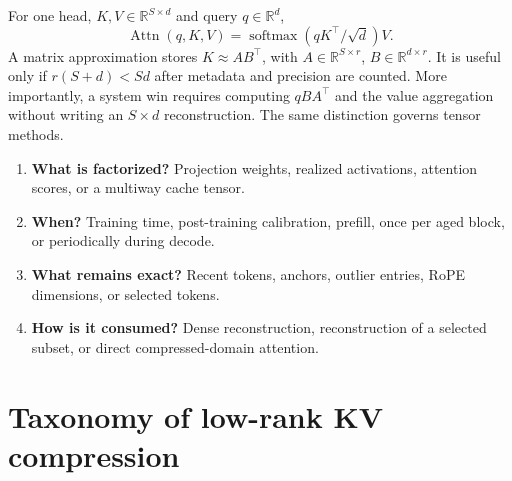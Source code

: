 \documentclass[10pt]{article}
\newcommand{\R}{\mathbb{R}}
\newcommand{\Attn}{\operatorname{Attn}}
\newcommand{\softmax}{\operatorname{softmax}}
\begin{document}
For one head, $K,V\in\R^{S\times d}$ and query $q\in\R^d$,
\[
 \Attn(q,K,V)=\softmax(qK^\top/\sqrt d)V.
\]
A matrix approximation stores $K\approx AB^\top$, with $A\in\R^{S\times r}$,
$B\in\R^{d\times r}$. It is useful only if $r(S+d)<Sd$ after metadata and precision are counted.
More importantly, a system win requires computing $qB A^\top$ and the value aggregation without
writing an $S\times d$ reconstruction. The same distinction governs tensor methods.

\begin{keybox}[title={Four independent design axes}]
\begin{enumerate}[leftmargin=1.5em,itemsep=2pt,topsep=2pt]
\item \textbf{What is factorized?} Projection weights, realized activations, attention scores, or
a multiway cache tensor.
\item \textbf{When?} Training time, post-training calibration, prefill, once per aged block, or
periodically during decode.
\item \textbf{What remains exact?} Recent tokens, anchors, outlier entries, RoPE dimensions, or
selected tokens.
\item \textbf{How is it consumed?} Dense reconstruction, reconstruction of a selected subset, or
direct compressed-domain attention.
\end{enumerate}
\end{keybox}

\section{Taxonomy of low-rank KV compression}
\end{document}
